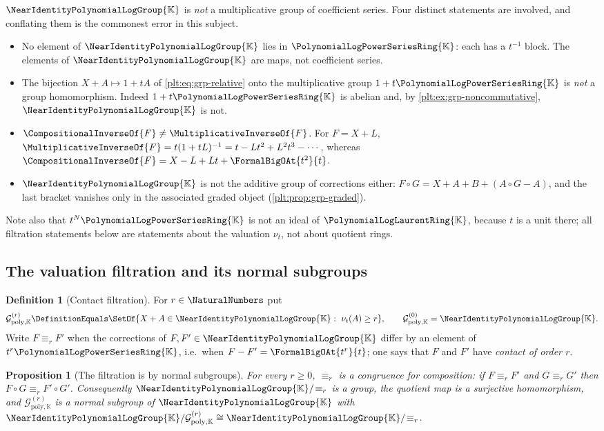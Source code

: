 \documentclass[11pt,oneside]{article}
\theoremstyle{plain}
\newtheorem{proposition}[theorem]{Proposition}
\theoremstyle{definition}
\newtheorem{definition}[theorem]{Definition}
\theoremstyle{remark}
\newcommand{\K}{\mathbb{K}}
\newcommand{\PLpow}{\PolynomialLogPowerSeriesRing{\K}}   %
\newcommand{\PLlau}{\PolynomialLogLaurentRing{\K}}       %
\newcommand{\Gnear}{\NearIdentityPolynomialLogGroup{\K}} %
\newcommand{\Gfilt}[1]{\mathcal{G}^{(#1)}_{\mathrm{poly},\K}}
\newcommand{\ordt}{\nu_{t}}                              %
\newcommand{\compose}{\mathbin{\circ}}
\begin{document}
\begin{warningbox}
\(\Gnear\) is \emph{not} a multiplicative group of coefficient series.  Four
distinct statements are involved, and conflating them is the commonest error in
this subject.
\begin{itemize}
\item No element of \(\Gnear\) lies in \(\PLpow\): each has a
\(t^{-1}\) block.  The elements of \(\Gnear\) are maps, not coefficient
series.
\item The bijection \(X+A\mapsto1+tA\) of \eqref{plt:eq:grp-relative} onto the
multiplicative group \(1+t\PLpow\) is \emph{not} a group homomorphism.  Indeed
\(1+t\PLpow\) is abelian and, by \cref{plt:ex:grp-noncommutative}, \(\Gnear\)
is not.
\item \(\CompositionalInverseOf{F}\ne\MultiplicativeInverseOf{F}\).  For
\(F=X+L\), \(\MultiplicativeInverseOf{F}=t(1+tL)^{-1}=t-Lt^2+L^2t^3-\cdots\),
whereas \(\CompositionalInverseOf{F}=X-L+Lt+\FormalBigOAt{t^2}{t}\).
\item \(\Gnear\) is not the additive group of corrections either:
\(F\compose G=X+A+B+(A\compose G-A)\), and the last bracket vanishes only in
the associated graded object (\cref{plt:prop:grp-graded}).
\end{itemize}
Note also that \(t^N\PLpow\) is not an ideal of \(\PLlau\), because \(t\) is a
unit there; all filtration statements below are statements about the valuation
\(\ordt\), not about quotient rings.
\end{warningbox}

\subsection{The valuation filtration and its normal subgroups}

\begin{definition}[Contact filtration]\label{plt:def:grp-filtration}
For \(r\in\NaturalNumbers\) put
\[
  \Gfilt{r}\DefinitionEquals\SetOf{X+A\in\Gnear:\ \ordt(A)\ge r},
  \qquad
  \Gfilt{0}=\Gnear .
\]
Write \(F\equiv_rF'\) when the corrections of \(F,F'\in\Gnear\) differ by an
element of \(t^r\PLpow\), i.e.\ when \(F-F'=\FormalBigOAt{t^r}{t}\); one says
that \(F\) and \(F'\) have \emph{contact of order \(r\)}.
\end{definition}

\begin{proposition}[The filtration is by normal subgroups]
\label{plt:prop:grp-congruence}
For every \(r\ge0\), \(\equiv_r\) is a congruence for composition: if
\(F\equiv_rF'\) and \(G\equiv_rG'\) then \(F\compose G\equiv_rF'\compose G'\).
Consequently \(\Gnear/\!\equiv_r\) is a group, the quotient map is a
surjective homomorphism, and \(\Gfilt{r}\) is a normal subgroup of \(\Gnear\)
with \(\Gnear/\Gfilt{r}\cong\Gnear/\!\equiv_r\).
\end{proposition}
\end{document}
